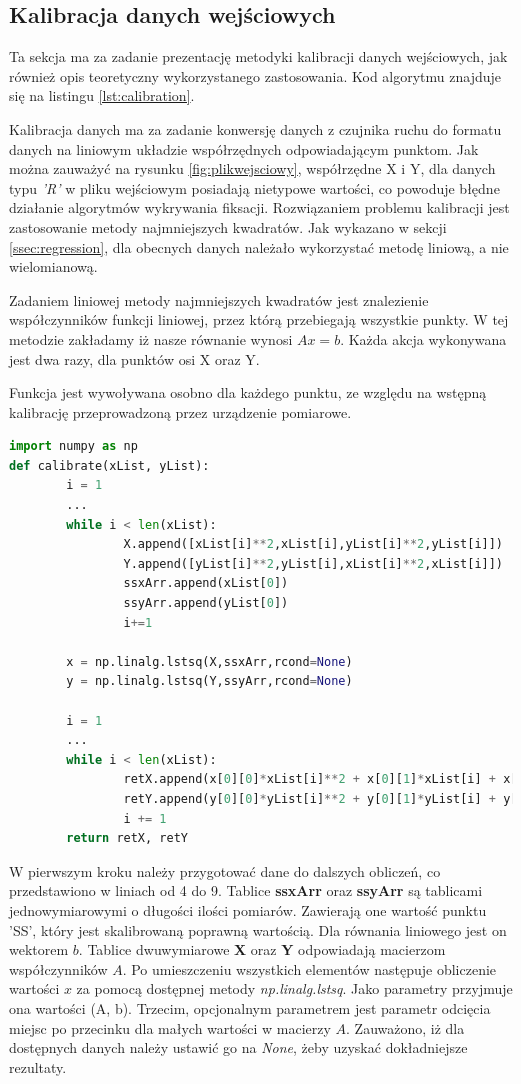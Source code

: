 \subsection{Kalibracja danych wejściowych}
Ta sekcja ma za zadanie prezentację metodyki kalibracji danych wejściowych, jak również opis teoretyczny wykorzystanego zastosowania. Kod algorytmu znajduje się na listingu \ref{lst:calibration}.\par
Kalibracja danych ma za zadanie konwersję danych z czujnika ruchu do formatu danych na liniowym układzie współrzędnych odpowiadającym punktom. Jak można zauważyć na rysunku \ref{fig:plikwejsciowy}, współrzędne X i Y, dla danych typu \emph{'R'} w pliku wejściowym posiadają nietypowe wartości, co powoduje błędne działanie algorytmów wykrywania fiksacji. Rozwiązaniem problemu kalibracji jest zastosowanie metody najmniejszych kwadratów. Jak wykazano w sekcji \ref{ssec:regression}, dla obecnych danych należało wykorzystać metodę liniową, a nie wielomianową.\par
Zadaniem liniowej metody najmniejszych kwadratów jest znalezienie współczynników funkcji liniowej, przez którą przebiegają wszystkie punkty. W tej metodzie zakładamy iż nasze równanie wynosi $Ax = b$. Każda akcja wykonywana jest dwa razy, dla punktów osi X oraz Y.\par
Funkcja jest wywoływana osobno dla każdego punktu, ze względu na wstępną kalibrację przeprowadzoną przez urządzenie pomiarowe.
\label{ssec:calibration}
\begin{lstlisting}[language=Python, caption=Algorytm kalibracji, label={lst:calibration}]
import numpy as np
def calibrate(xList, yList):
        i = 1
        ...
        while i < len(xList):
                X.append([xList[i]**2,xList[i],yList[i]**2,yList[i]])
                Y.append([yList[i]**2,yList[i],xList[i]**2,xList[i]])
                ssxArr.append(xList[0])
                ssyArr.append(yList[0])
                i+=1
        
        x = np.linalg.lstsq(X,ssxArr,rcond=None)
        y = np.linalg.lstsq(Y,ssyArr,rcond=None)

        i = 1
        ...
        while i < len(xList):
                retX.append(x[0][0]*xList[i]**2 + x[0][1]*xList[i] + x[0][2]*yList[i]**2 + x[0][3]*yList[i])
                retY.append(y[0][0]*yList[i]**2 + y[0][1]*yList[i] + y[0][2]*xList[i]**2 + y[0][3]*xList[i])
                i += 1
        return retX, retY
\end{lstlisting}
W pierwszym kroku należy przygotować dane do dalszych obliczeń, co przedstawiono w liniach od 4 do 9. Tablice \textbf{ssxArr} oraz \textbf{ssyArr} są tablicami jednowymiarowymi o długości ilości pomiarów. Zawierają one wartość punktu 'SS', który jest skalibrowaną poprawną wartością. Dla równania liniowego jest on wektorem $b$. Tablice dwuwymiarowe \textbf{X} oraz \textbf{Y} odpowiadają macierzom współczynników $A$. Po umieszczeniu wszystkich elementów następuje obliczenie wartości $x$ za pomocą dostępnej metody \emph{np.linalg.lstsq}. Jako parametry przyjmuje ona wartości (A, b). Trzecim, opcjonalnym parametrem jest parametr odcięcia miejsc po przecinku dla małych wartości w macierzy $A$. Zauważono, iż dla dostępnych danych należy ustawić go na \emph{None}, żeby uzyskać dokładniejsze rezultaty.\par
